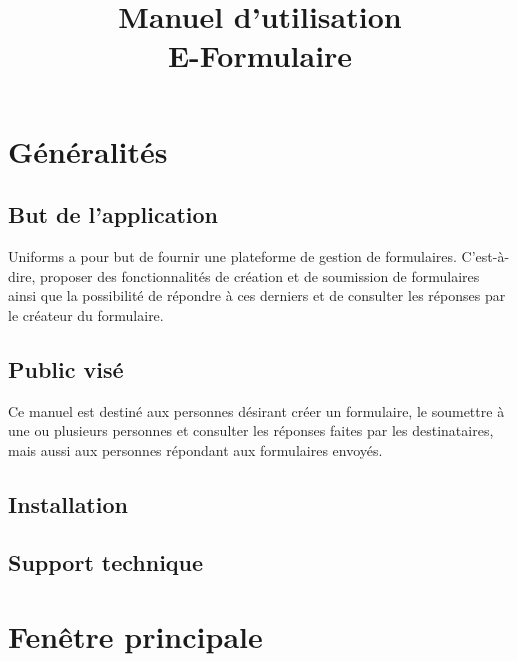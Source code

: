 \documentclass[a4paper,11pt,final]{report}
\title{\textbf{Manuel d'utilisation}\\E-Formulaire}
\author{}
\date{}
\begin{document}
\maketitle
\setcounter{page}{2}
\tableofcontents 
\chapter{Généralités}
\section{But de l'application}
Uniforms a pour but de fournir une plateforme de gestion de formulaires. C'est-à-dire, proposer des fonctionnalités de création et de soumission de formulaires ainsi que la possibilité de répondre à ces derniers et de consulter les réponses par le créateur du formulaire.

\section{Public visé}
Ce manuel est destiné aux personnes désirant créer un formulaire, le soumettre à une ou plusieurs personnes et consulter les réponses faites par les destinataires, mais aussi aux personnes répondant aux formulaires envoyés.

\section{Installation}

\section{Support technique}

\chapter{Fenêtre principale}
\end{document}

